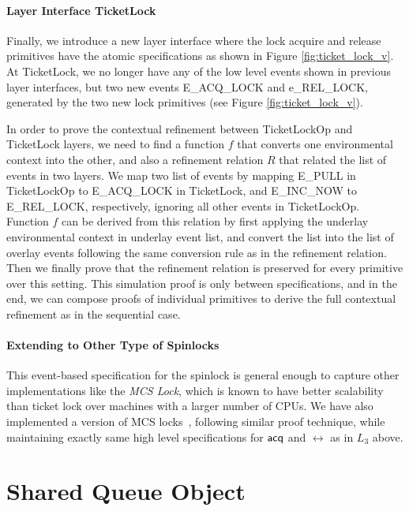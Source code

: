 \paragraph{Layer Interface TicketLock}

Finally, we introduce a new layer interface where the lock acquire and release
primitives have the atomic specifications as shown in Figure \ref{fig:ticket_lock_v}.
At TicketLock, we no longer have any of the low level events shown in previous
layer interfaces, but two new events \textsf{E\_ACQ\_LOCK} and \textsf{e\_REL\_LOCK},
generated by the two new lock primitives (see Figure \ref{fig:ticket_lock_v}).

In order to prove the contextual refinement between TicketLockOp and
TicketLock layers, we need to find a function $f$ that converts
one environmental context into the other, and also a refinement relation
$R$ that related the list of events in two layers.
We map two list of events by mapping \textsf{E\_PULL} in 
TicketLockOp to \textsf{E\_ACQ\_LOCK} in TicketLock,
and \textsf{E\_INC\_NOW} to  \textsf{E\_REL\_LOCK}, respectively, ignoring all other
events in TicketLockOp. Function $f$ can be derived from this relation by
first applying the underlay environmental context in underlay event list,
and convert the list into the list of overlay events following the same conversion
rule as in the refinement relation.
Then we finally prove that the refinement relation is preserved for every primitive
over this setting.
This simulation proof is only between specifications, and in the end,
we can compose proofs of individual primitives to derive the full
contextual refinement as in the sequential case.

\paragraph{Extending to Other Type of Spinlocks}
This event-based specification for the spinlock is general enough
to capture  other implementations like the \emph{MCS Lock},
which is known to have better scalability than ticket lock
over machines with a larger number of CPUs. We have also
implemented a version of MCS locks~\cite{kim2017safety}, following
similar proof technique, while maintaining exactly same high level
specifications for $\mathsf{acq}$ and $\rel$ as in $L_3$ above.


\section{Shared Queue Object}


